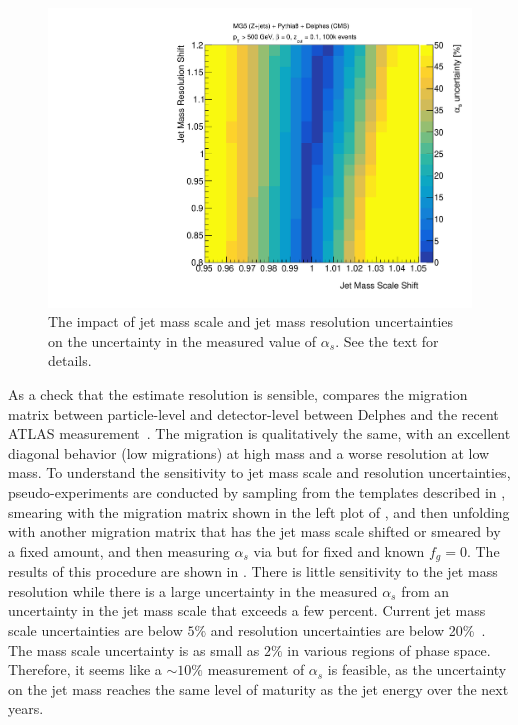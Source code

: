 \begin{figure}[t]
\begin{center}
\includegraphics[width = 0.49\columnwidth]{figures/experimentaldemo/resolution_scan.pdf}
\end{center}
\caption{The impact of jet mass scale and jet mass resolution uncertainties on the uncertainty in the measured value of $\alpha_s$.  See the text for details.}
\label{fig:expfit}
\end{figure}

As a check that the estimate resolution is sensible,   compares the migration matrix between particle-level and detector-level between Delphes and the recent ATLAS measurement~\cite{Aaboud:2017qwh}.
%
The migration is qualitatively the same, with an excellent diagonal behavior (low migrations) at high mass and a worse resolution at low mass.
%
To understand the sensitivity to jet mass scale and resolution uncertainties, pseudo-experiments are conducted by sampling from the templates described in , smearing with the migration matrix shown in the left plot of , and then unfolding with another migration matrix that has the jet mass scale shifted or smeared by a fixed amount, and then measuring $\alpha_s$ via  but for fixed and known $f_g=0$.
%
The results of this procedure are shown in .
%
There is little sensitivity to the jet mass resolution while there is a large uncertainty in the measured $\alpha_s$ from an uncertainty in the jet mass scale that exceeds a few percent.
%
Current jet mass scale uncertainties are below $5\%$ and resolution uncertainties are below 20\%~\cite{ATLAS-CONF-2017-063,CMS-PAS-JME-16-003}.
%
The mass scale uncertainty is as small as $2\%$ in various regions of phase space.
%
Therefore, it seems like a $\sim 10\%$ measurement of $\alpha_s$ is feasible, as the uncertainty on the jet mass reaches the same level of maturity as the jet energy over the next years.



